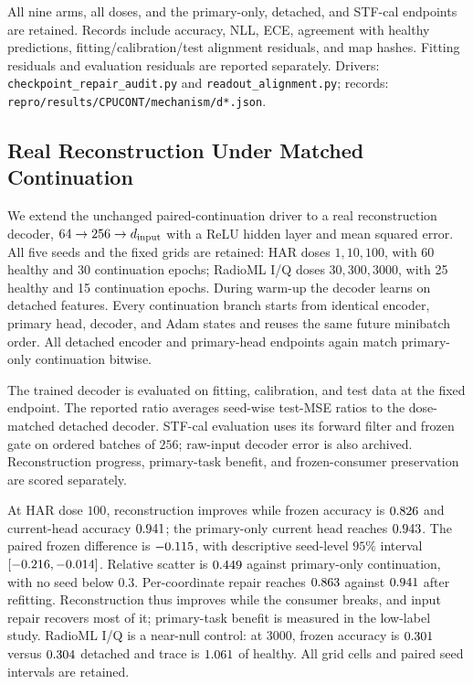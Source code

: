 \documentclass{article}
\begin{document}
All nine arms, all doses, and the primary-only, detached, and STF-cal endpoints are retained. Records include accuracy, NLL, ECE, agreement with healthy predictions, fitting/calibration/test alignment residuals, and map hashes. Fitting residuals and evaluation residuals are reported separately. Drivers: \texttt{checkpoint\_repair\_audit.py} and \texttt{readout\_alignment.py}; records: \texttt{repro/results/CPUCONT/mechanism/d*.json}.

\subsection{Real Reconstruction Under Matched Continuation}\label{app:reconstruction_paired}

We extend the unchanged paired-continuation driver to a real reconstruction decoder, $64\to256\to d_{\rm input}$ with a ReLU hidden layer and mean squared error. All five seeds and the fixed grids are retained: HAR doses $1,10,100$, with 60 healthy and 30 continuation epochs; RadioML I/Q doses $30,300,3000$, with 25 healthy and 15 continuation epochs. During warm-up the decoder learns on detached features. Every continuation branch starts from identical encoder, primary head, decoder, and Adam states and reuses the same future minibatch order. All detached encoder and primary-head endpoints again match primary-only continuation bitwise.



The trained decoder is evaluated on fitting, calibration, and test data at the fixed endpoint. The reported ratio averages seed-wise test-MSE ratios to the dose-matched detached decoder. STF-cal evaluation uses its forward filter and frozen gate on ordered batches of $256$; raw-input decoder error is also archived. Reconstruction progress, primary-task benefit, and frozen-consumer preservation are scored separately.

At HAR dose $100$, reconstruction improves while frozen accuracy is $0.826$ and current-head accuracy $0.941$; the primary-only current head reaches $0.943$. The paired frozen difference is $-0.115$, with descriptive seed-level $95\%$ interval $[-0.216,-0.014]$. Relative scatter is $0.449$ against primary-only continuation, with no seed below $0.3$. Per-coordinate repair reaches $0.863$ against $0.941$ after refitting. Reconstruction thus improves while the consumer breaks, and input repair recovers most of it; primary-task benefit is measured in the low-label study. RadioML I/Q is a near-null control: at $3000$, frozen accuracy is $0.301$ versus $0.304$ detached and trace is $1.061$ of healthy. All grid cells and paired seed intervals are retained.
\end{document}
